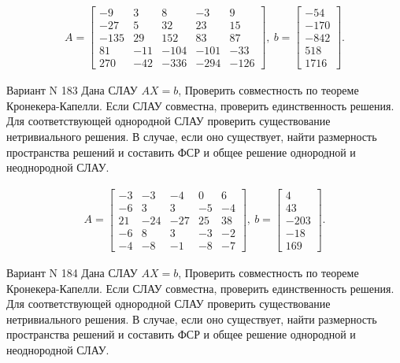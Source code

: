 \documentclass[11pt]{report}
\begin{document}
\begin{align*}
 A = \left[\begin{matrix}-9 & 3 & 8 & -3 & 9\\-27 & 5 & 32 & 23 & 15\\-135 & 29 & 152 & 83 & 87\\81 & -11 & -104 & -101 & -33\\270 & -42 & -336 & -294 & -126\end{matrix}\right],
\ b = \left[\begin{matrix}-54\\-170\\-842\\518\\1716\end{matrix}\right]. 
 \end{align*}

Вариант N 183
Дана СЛАУ $AX = b$,
Проверить совместность по теореме Кронекера-Капелли. Если СЛАУ совместна, проверить единственность решения.
Для соответствующей однородной СЛАУ проверить существование нетривиального решения. В случае, если оно существует,
найти размерность пространства решений и составить ФСР и общее решение однородной  и неоднородной СЛАУ.


\begin{align*}
 A = \left[\begin{matrix}-3 & -3 & -4 & 0 & 6\\-6 & 3 & 3 & -5 & -4\\21 & -24 & -27 & 25 & 38\\-6 & 8 & 3 & -3 & -2\\-4 & -8 & -1 & -8 & -7\end{matrix}\right],
\ b = \left[\begin{matrix}4\\43\\-203\\-18\\169\end{matrix}\right]. 
 \end{align*}

Вариант N 184
Дана СЛАУ $AX = b$,
Проверить совместность по теореме Кронекера-Капелли. Если СЛАУ совместна, проверить единственность решения.
Для соответствующей однородной СЛАУ проверить существование нетривиального решения. В случае, если оно существует,
найти размерность пространства решений и составить ФСР и общее решение однородной  и неоднородной СЛАУ.
\end{document}
